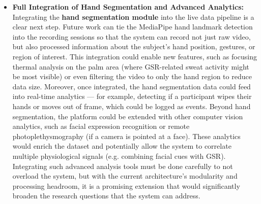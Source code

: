 \begin{itemize}
\item \textbf{Full Integration of Hand Segmentation and Advanced Analytics:}
  Integrating the \textbf{hand segmentation module} into the live data
  pipeline is a clear next step. Future work can tie the MediaPipe hand
  landmark detection into the recording sessions so that the system can
  record not just raw video, but also processed information about the
  subject's hand position, gestures, or region of interest. This
  integration could enable new features, such as focusing thermal
  analysis on the palm area (where GSR-related sweat activity might be
  most visible) or even filtering the video to only the hand region to
  reduce data size. Moreover, once integrated, the hand segmentation
  data could feed into real-time analytics --- for example, detecting if
  a participant wipes their hands or moves out of frame, which could be
  logged as events. Beyond hand segmentation, the platform could be
  extended with other computer vision analytics, such as facial
  expression recognition or remote photoplethysmography (if a camera is
  pointed at a face). These analytics would enrich the dataset and
  potentially allow the system to correlate multiple physiological
  signals (e.g. combining facial cues with GSR). Integrating such
  advanced analysis tools must be done carefully to not overload the
  system, but with the current architecture's modularity and processing
  headroom, it is a promising extension that would significantly broaden
  the research questions that the system can address.


\end{itemize}
